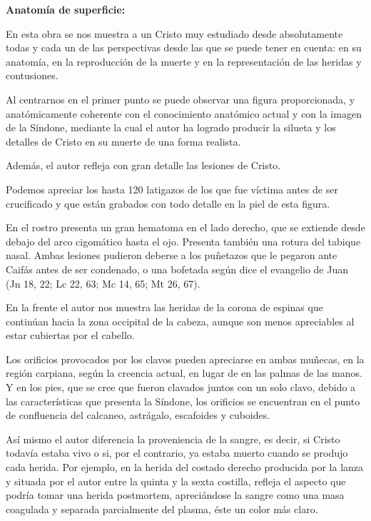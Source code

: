 \vspace{12pt}
\textbf{Anatomía de superficie:}

En esta obra se nos muestra a un Cristo muy estudiado desde absolutamente todas y cada un de las perspectivas desde las que se puede tener en cuenta: en su anatomía, en la reproducción de la muerte y en la representación de las heridas y contusiones.

Al centrarnos en el primer punto se puede observar una figura proporcionada, y anatómicamente coherente con el conocimiento anatómico actual y con la imagen de la Síndone, mediante la cual el autor ha logrado producir la silueta y los detalles de Cristo en su muerte de una forma realista.

Además, el autor refleja con gran detalle las lesiones de Cristo.

Podemos apreciar los hasta 120 latigazos de los que fue víctima antes de ser crucificado y que están grabados con todo detalle en la piel de esta figura.

En el rostro presenta un gran hematoma en el lado derecho, que se extiende desde debajo del arco cigomático hasta el ojo. Presenta también una rotura del tabique nasal. Ambas lesiones pudieron deberse a los puñetazos que le pegaron ante Caifás antes de ser condenado, o una bofetada según dice el evangelio de Juan (Jn 18, 22; Lc 22, 63; Mc 14, 65; Mt 26, 67).

En la frente el autor nos muestra las heridas de la corona de espinas que continúan hacia la zona occipital de la cabeza, aunque son menos apreciables al estar cubiertas por el cabello.

Los orificios provocados por los clavos pueden apreciarse en ambas muñecas, en la región carpiana, según la creencia actual, en lugar de en las palmas de las manos. Y en los pies, que se cree que fueron clavados juntos con un solo clavo, debido a las características que presenta la Síndone, los orificios se encuentran en el punto de confluencia del calcaneo, astrágalo, escafoides y cuboides.

Así mismo el autor diferencia la proveniencia de la sangre, es decir, si Cristo todavía estaba vivo o si, por el contrario, ya estaba muerto cuando se produjo cada herida. Por ejemplo, en la herida del costado derecho producida por la lanza y situada por el autor entre la quinta y la sexta costilla, refleja el aspecto que podría tomar una herida postmortem, apreciándose la sangre como una masa coagulada y separada parcialmente del plasma, éste un color más claro.

